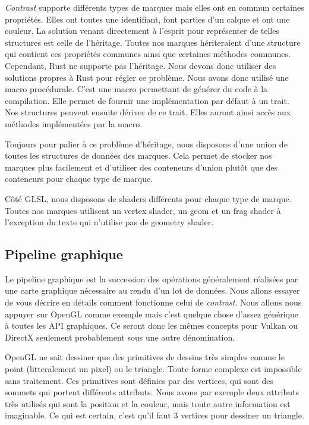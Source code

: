 \documentclass[12pt]{article}
\begin{document}
\textit{Contrast} supporte différents types de marques mais elles ont en commun certaines propriétés.
Elles ont toutes une identifiant, font parties d'un calque et ont une couleur.
La solution venant directement à l'esprit pour représenter de telles structures est celle de l'héritage.
Toutes nos marques hériteraient d'une structure qui contient ces propriétés communes ainsi que certaines
méthodes communes.
Cependant, Rust ne supporte pas l'héritage. Nous devons donc utiliser des solutions propres à Rust pour régler
ce problème.
Nous avons donc utilisé une macro procédurale. C'est une macro permettant de générer du code à la
compilation. Elle permet de fournir une implémentation par défaut à un trait. Nos structures peuvent
ensuite dériver de ce trait. Elles auront ainsi accès aux méthodes implémentées par la macro.

Toujours pour palier à ce problème d'héritage, nous disposons d'une union de toutes les structures
de données des marques. Cela permet de stocker nos marques plus facilement et d'utiliser des conteneurs d'union plutôt que des conteneurs pour chaque type de marque.

Côté GLSL, nous disposons de shaders différents pour chaque type de marque. Toutes nos marques utilisent un vertex shader, un \gls{geom} et un \gls{frag} shader à l'exception du texte qui n'utilise pas de geometry shader.

\subsection{Pipeline graphique}

Le pipeline graphique est la succession des opérations généralement réalisées par une carte graphique nécessaire au rendu d’un lot de données. Nous allons essayer de vous décrire en détails comment
fonctionne celui de \textit{contrast}. Nous allons nous appuyer sur OpenGL comme exemple mais c'est quelque chose d'assez générique à toutes les API graphiques. Ce seront donc les mêmes concepts pour
Vulkan ou DirectX seulement probablement sous une autre dénomination.

OpenGL ne sait dessiner que des primitives de dessins très simples comme le point (litteralement un pixel) ou le triangle. Toute forme complexe est impossible sans traitement.
Ces primitives sont définies par des vertices, qui sont des sommets qui portent différents attributs. Nous avons par exemple deux attributs très utilisés qui sont la position et
la couleur, mais toute autre information est imaginable. Ce qui est certain, c'est qu'il faut 3 vertices pour dessiner un triangle.
\end{document}
